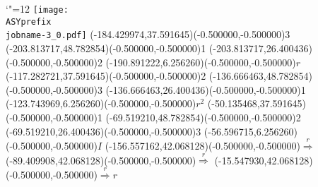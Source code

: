\setlength{\unitlength}{1pt}
\makeatletter%
\let\ASYencoding\f@encoding%
\let\ASYfamily\f@family%
\let\ASYseries\f@series%
\let\ASYshape\f@shape%
\makeatother%
{\catcode`"=12%
\texttt{[image: \\ASYprefix\\jobname-3\_0.pdf]}%
}%
\color{ASYcolor}
\fontsize{12.000000}{14.400000}\selectfont
\usefont{\ASYencoding}{\ASYfamily}{\ASYseries}{\ASYshape}%
\ASYalign(-184.429974,37.591645)(-0.500000,-0.500000){3}%
\color{ASYcolor}
\fontsize{12.000000}{14.400000}\selectfont
\ASYalign(-203.813717,48.782854)(-0.500000,-0.500000){1}%
\color{ASYcolor}
\fontsize{12.000000}{14.400000}\selectfont
\ASYalign(-203.813717,26.400436)(-0.500000,-0.500000){2}%
\color{ASYcolor}
\fontsize{12.000000}{14.400000}\selectfont
\ASYalign(-190.891222,6.256260)(-0.500000,-0.500000){$r$}%
\color{ASYcolor}
\fontsize{12.000000}{14.400000}\selectfont
\ASYalign(-117.282721,37.591645)(-0.500000,-0.500000){2}%
\color{ASYcolor}
\fontsize{12.000000}{14.400000}\selectfont
\ASYalign(-136.666463,48.782854)(-0.500000,-0.500000){3}%
\color{ASYcolor}
\fontsize{12.000000}{14.400000}\selectfont
\ASYalign(-136.666463,26.400436)(-0.500000,-0.500000){1}%
\color{ASYcolor}
\fontsize{12.000000}{14.400000}\selectfont
\ASYalign(-123.743969,6.256260)(-0.500000,-0.500000){$r^2$}%
\color{ASYcolor}
\fontsize{12.000000}{14.400000}\selectfont
\ASYalign(-50.135468,37.591645)(-0.500000,-0.500000){1}%
\color{ASYcolor}
\fontsize{12.000000}{14.400000}\selectfont
\ASYalign(-69.519210,48.782854)(-0.500000,-0.500000){2}%
\color{ASYcolor}
\fontsize{12.000000}{14.400000}\selectfont
\ASYalign(-69.519210,26.400436)(-0.500000,-0.500000){3}%
\color{ASYcolor}
\fontsize{12.000000}{14.400000}\selectfont
\ASYalign(-56.596715,6.256260)(-0.500000,-0.500000){$I$}%
\color{ASYcolor}
\fontsize{12.000000}{14.400000}\selectfont
\ASYalign(-156.557162,42.068128)(-0.500000,-0.500000){$\stackrel{r}{\Longrightarrow}$}%
\color{ASYcolor}
\fontsize{12.000000}{14.400000}\selectfont
\ASYalign(-89.409908,42.068128)(-0.500000,-0.500000){$\stackrel{r}{\Longrightarrow}$}%
\color{ASYcolor}
\fontsize{12.000000}{14.400000}\selectfont
\ASYalign(-15.547930,42.068128)(-0.500000,-0.500000){$\stackrel{r}{\Longrightarrow}r$}%
